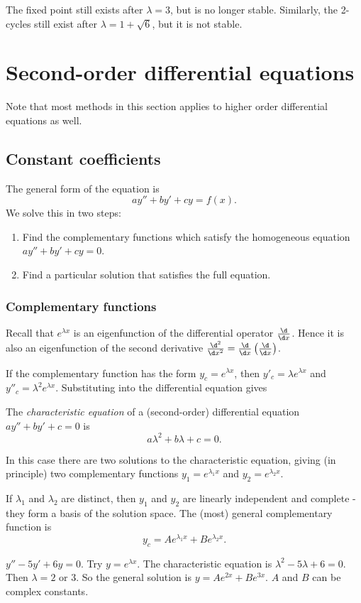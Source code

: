 \documentclass[a4paper]{article}
\begin{document}
  \note The fixed point still exists after $\lambda = 3$, but is no longer stable. Similarly, the 2-cycles still exist after $\lambda = 1 + \sqrt{6}$, but it is not stable.

  \section{Second-order differential equations}
  Note that most methods in this section applies to higher order differential equations as well.
  \subsection{Constant coefficients}
  The general form of the equation is 
  \[
    ay'' + by' + cy = f(x).
  \]
  We solve this in two steps:
  \begin{enumerate}
    \item Find the complementary functions which satisfy the homogeneous equation $ay'' + by' + cy = 0$.
    \item Find a particular solution that satisfies the full equation.
  \end{enumerate}
  \subsubsection{Complementary functions}
  Recall that $e^{\lambda x}$ is an eigenfunction of the differential operator $\frac{\d}{\d x}$. Hence it is also an eigenfunction of the second derivative $\frac{\d^2}{\d x^2} = \frac{\d}{\d x}\left(\frac{\d }{\d x}\right)$.

  If the complementary function has the form $y_c = e^{\lambda x}$, then $y'_c = \lambda e^{\lambda x}$ and $y''_c = \lambda^2 e^{\lambda x}$. Substituting into the differential equation gives
  \begin{defi}
    The \emph{characteristic equation} of a (second-order) differential equation $ay'' + by' + c = 0$ is
    \[
      a\lambda^2 + b\lambda + c = 0.
    \]
  \end{defi}

  In this case there are two solutions to the characteristic equation, giving (in principle) two complementary functions $y_1 = e^{\lambda_1 x}$ and $y_2 = e^{\lambda_2 x}$.

  If $\lambda_1$ and $\lambda_2$ are distinct, then $y_1$ and $y_2$ are linearly independent and complete - they form a basis of the solution space. The (most) general complementary function is
  \[
    y_c = Ae^{\lambda_1 x} + Be^{\lambda_2 x}.
  \]
  \begin{eg}
    $y'' - 5y' + 6y = 0$. Try $y = e^{\lambda x}$. The characteristic equation is $\lambda^2 - 5\lambda + 6 = 0$. Then $\lambda = 2$ or $3$. So the general solution is $y = Ae^{2x} + Be^{3x}$.
    \note $A$ and $B$ can be complex constants.
  \end{eg}
\end{document}
